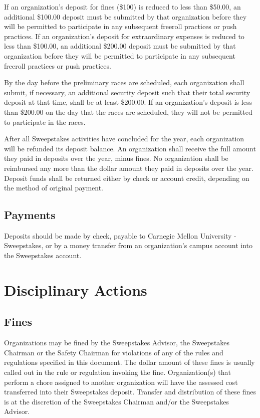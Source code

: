 	If an organization's deposit for fines (\$100) is reduced to less than \$50.00,
	an additional \$100.00 deposit must be submitted by that organization before
	they will be permitted to participate in any subsequent freeroll practices or
	push practices. If an organization's deposit for extraordinary expenses is
	reduced to less than \$100.00, an additional \$200.00 deposit must be submitted
	by that organization before they will be permitted to participate in any
	subsequent freeroll practices or push practices.

	By the day before the preliminary races are scheduled, each organization shall
	submit, if necessary, an additional security deposit such that their total
	security deposit at that time, shall be at least \$200.00. If an organization's
	deposit is less than \$200.00 on the day that the races are scheduled, they
	will not be permitted to participate in the races.

	After all Sweepstakes activities have concluded for the year, each organization
	will be refunded its deposit balance. An organization shall receive the full
	amount they paid in deposits over the year, minus fines. No organization shall
	be reimbursed any more than the dollar amount they paid in deposits over the
	year. Deposit funds shall be returned either by check or account credit, depending
	on the method of original payment.

\subsection{Payments}

	Deposits should be made by check, payable to Carnegie Mellon University -
	Sweepstakes, or by a money transfer from an organization's campus account into
	the Sweepstakes account.

\section{Disciplinary Actions}
\label{sec:DiciplinaryActions}

\subsection{Fines}

	Organizations may be fined by the Sweepstakes Advisor, the Sweepstakes Chairman
	or the Safety Chairman for violations of any of the rules and regulations
	specified in this document. The dollar amount of these fines is usually called
	out in the rule or regulation invoking the fine. Organization(s) that perform a
	chore assigned to another organization will have the assessed cost transferred 
	into their Sweepstakes deposit. Transfer and distribution of these fines is at the 
	discretion of the Sweepstakes Chairman and/or the Sweepstakes Advisor.


